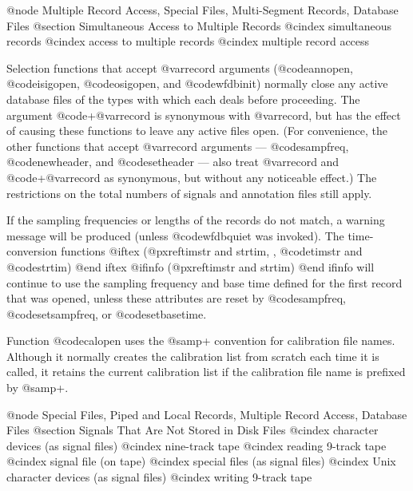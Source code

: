 {{{{{{{{{{@node     Multiple Record Access, Special Files, Multi-Segment Records, Database Files
@section Simultaneous Access to Multiple Records
@cindex simultaneous records
@cindex access to multiple records
@cindex multiple record access

Selection functions that accept @var{record} arguments (@code{annopen},
@code{isigopen}, @code{osigopen}, and @code{wfdbinit}) normally close any
active database files of the types with which each deals before
proceeding.  The argument @code{+}@var{record} is synonymous with
@var{record}, but has the effect of causing these functions to leave any
active files open.  (For convenience, the other functions that accept
@var{record} arguments --- @code{sampfreq}, @code{newheader}, and
@code{setheader} --- also treat @var{record} and @code{+}@var{record} as
synonymous, but without any noticeable effect.)  The restrictions on the
total numbers of signals and annotation files still apply.

If the sampling frequencies or lengths of the records do not match, a warning
message will be produced (unless @code{wfdbquiet} was invoked).  The
time-conversion functions
@iftex
(@pxref{timstr and strtim, , @code{timstr} and @code{strtim}})
@end iftex
@ifinfo
(@pxref{timstr and strtim})
@end ifinfo
will continue to use the sampling frequency and base
time defined for the first record that was opened, unless these
attributes are reset by @code{sampfreq}, @code{setsampfreq}, or
@code{setbasetime}.

Function @code{calopen} uses the @samp{+} convention for calibration
file names.  Although it normally creates the calibration list from
scratch each time it is called, it retains the current calibration list
if the calibration file name is prefixed by @samp{+}.

@node     Special Files, Piped and Local Records, Multiple Record Access, Database Files
@section Signals That Are Not Stored in Disk Files
@cindex character devices (as signal files)
@cindex nine-track tape
@cindex reading 9-track tape
@cindex signal file (on tape)
@cindex special files (as signal files)
@cindex Unix character devices (as signal files)
@cindex writing 9-track tape

}}}}}}}}}}
